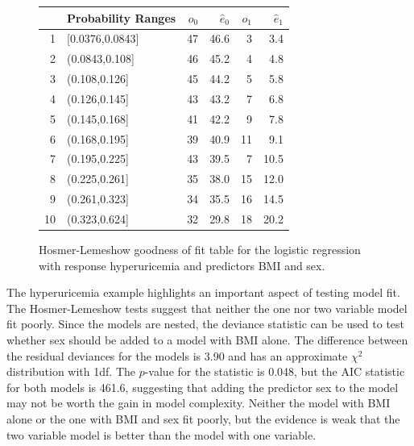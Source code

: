 \begin{figure}[ht]
\centering
\begin{tabular}{rlrrrr}
  \hline
 & Probability Ranges & $o_0$ & $\hat{e}_0$ & $o_1$ & $\hat{e}_1$ \\
  \hline
1 & [0.0376,0.0843] & 47 & 46.6 & 3 & 3.4 \\
  2 & (0.0843,0.108] & 46 & 45.2 & 4 & 4.8 \\
  3 & (0.108,0.126] & 45 & 44.2 & 5 & 5.8 \\
  4 & (0.126,0.145] & 43 & 43.2 & 7 & 6.8 \\
  5 & (0.145,0.168] & 41 & 42.2 & 9 & 7.8 \\
  6 & (0.168,0.195] & 39 & 40.9 & 11 & 9.1 \\
  7 & (0.195,0.225] & 43 & 39.5 & 7 & 10.5 \\
  8 & (0.225,0.261] & 35 & 38.0 & 15 & 12.0 \\
  9 & (0.261,0.323] & 34 & 35.5 & 16 & 14.5 \\
  10 & (0.323,0.624] & 32 & 29.8 & 18 & 20.2 \\
   \hline
\end{tabular}
\caption{Hosmer-Lemeshow goodness of fit table for the
       logistic regression with response hyperuricemia and predictors BMI and sex.}
\label{figure:HLTestHyperuricemiaBMISex}
\end{figure}

The hyperuricemia example highlights an important aspect of testing model fit.  The Hosmer-Lemeshow tests suggest that neither the one nor two variable model fit poorly. Since the models are nested, the deviance statistic can be used to test whether sex should be added to a model with BMI alone.  The difference between the residual deviances for the models is 3.90 and has an approximate $\chi^2$ distribution with 1df.  The $p$-value for the statistic is 0.048, but the AIC statistic for both models is 461.6, suggesting that adding the predictor sex to the model may not be worth the gain in model complexity.  Neither the model with BMI alone or the one with BMI and sex fit poorly, but the evidence is weak that the two variable model is better than the model with one variable.  

